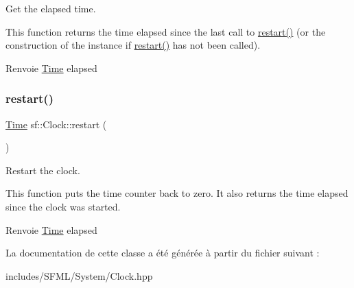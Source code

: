 Get the elapsed time. 

This function returns the time elapsed since the last call to \hyperlink{classsf_1_1Clock_a123e2627f2943e5ecaa1db0c7df3231b}{restart()} (or the construction of the instance if \hyperlink{classsf_1_1Clock_a123e2627f2943e5ecaa1db0c7df3231b}{restart()} has not been called).

\begin{DoxyReturn}{Renvoie}
\hyperlink{classsf_1_1Time}{Time} elapsed 
\end{DoxyReturn}
\mbox{\label{classsf_1_1Clock_a123e2627f2943e5ecaa1db0c7df3231b}} 
\subsubsection{\texorpdfstring{restart()}{restart()}}
{\footnotesize\ttfamily \hyperlink{classsf_1_1Time}{Time} sf\+::\+Clock\+::restart (\begin{DoxyParamCaption}{ }\end{DoxyParamCaption})}



Restart the clock. 

This function puts the time counter back to zero. It also returns the time elapsed since the clock was started.

\begin{DoxyReturn}{Renvoie}
\hyperlink{classsf_1_1Time}{Time} elapsed 
\end{DoxyReturn}


La documentation de cette classe a été générée à partir du fichier suivant \+:\begin{DoxyCompactItemize}
\item 
includes/\+S\+F\+M\+L/\+System/Clock.\+hpp\end{DoxyCompactItemize}
